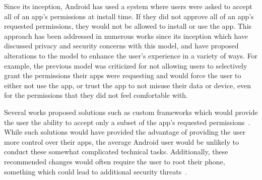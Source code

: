 \documentclass{sig-alternate-05-2015}
\begin{document}
Since its inception, Android has used a system where users were asked to accept all of an app's permissions at install time. If they did not approve all of an app's requested permissions, they would not be allowed to install or use the app. This approach has been addressed in numerous works since its inception which have discussed privacy and security concerns with this model, and have proposed alterations to the model to enhance the user's experience in a variety of ways. For example, the previous model was criticized for not allowing users to selectively grant the permissions their apps were requesting and would force the user to either not use the app, or trust the app to not misuse their data or device, even for the permissions that they did not feel comfortable with.

Several works proposed solutions such as custom frameworks which would provide the user the ability to accept only a subset of the app's requested permissions~\cite{6949282, nauman2010apex, Conti:2010:CCP:1949317.1949355, Rasthofer:2014:DEC:2703000.2703303}. While such solutions would have provided the advantage of providing the user more control over their apps, the average Android user would be unlikely to conduct these somewhat complicated technical tasks. Additionally, these recommended changes would often require the user to root their phone, something which could lead to additional security threats~\cite{Rasthofer:2014:DEC:2703000.2703303}.




%
%
%
%
%
%
%
%
%
%
%
%








\end{document}

